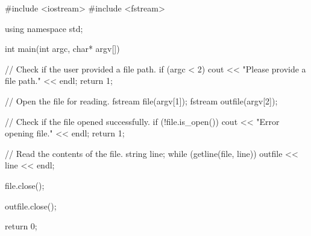 #include <iostream>
#include <fstream>

using namespace std;

int main(int argc, char* argv[]) {
    // Check if the user provided a file path.
    if (argc < 2) {
        cout << "Please provide a file path." << endl;
        return 1;
    }

    // Open the file for reading.
    fstream file(argv[1]);
    fstream outfile(argv[2]);

    // Check if the file opened successfully.
    if (!file.is_open()) {
        cout << "Error opening file." << endl;
        return 1;
    }

    // Read the contents of the file.
    string line;
    while (getline(file, line)) {
        outfile << line << endl;
    }

    file.close();

    outfile.close();

    return 0;
}